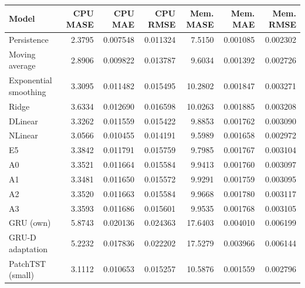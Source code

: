 \begin{tabular}{lrrrrrr}
\toprule
Model & CPU MASE & CPU MAE & CPU RMSE & Mem. MASE & Mem. MAE & Mem. RMSE \\
\midrule
Persistence & 2.3795 & 0.007548 & 0.011324 & 7.5150 & 0.001085 & 0.002302 \\
Moving average & 2.8906 & 0.009822 & 0.013787 & 9.6034 & 0.001392 & 0.002726 \\
Exponential smoothing & 3.3095 & 0.011482 & 0.015495 & 10.2802 & 0.001847 & 0.003271 \\
Ridge & 3.6334 & 0.012690 & 0.016598 & 10.0263 & 0.001885 & 0.003208 \\
DLinear & 3.3262 & 0.011559 & 0.015422 & 9.8853 & 0.001762 & 0.003090 \\
NLinear & 3.0566 & 0.010455 & 0.014191 & 9.5989 & 0.001658 & 0.002972 \\
E5 & 3.3842 & 0.011791 & 0.015759 & 9.7985 & 0.001767 & 0.003104 \\
A0 & 3.3521 & 0.011664 & 0.015584 & 9.9413 & 0.001760 & 0.003097 \\
A1 & 3.3481 & 0.011650 & 0.015572 & 9.9291 & 0.001759 & 0.003095 \\
A2 & 3.3520 & 0.011663 & 0.015584 & 9.9668 & 0.001780 & 0.003117 \\
A3 & 3.3593 & 0.011686 & 0.015601 & 9.9535 & 0.001768 & 0.003105 \\
GRU (own) & 5.8743 & 0.020136 & 0.024363 & 17.6403 & 0.004010 & 0.006199 \\
GRU-D adaptation & 5.2232 & 0.017836 & 0.022202 & 17.5279 & 0.003966 & 0.006144 \\
PatchTST (small) & 3.1112 & 0.010653 & 0.015257 & 10.5876 & 0.001559 & 0.002796 \\
\bottomrule
\end{tabular}
